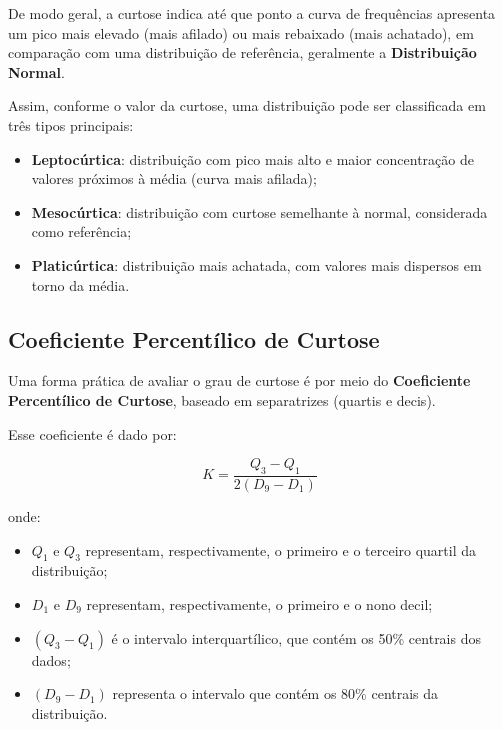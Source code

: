 De modo geral, a curtose indica até que ponto a curva de frequências apresenta
um pico mais elevado (mais afilado) ou mais rebaixado (mais achatado), em
comparação com uma distribuição de referência, geralmente a
\textbf{Distribuição Normal}. \vskip0.3cm

Assim, conforme o valor da curtose, uma distribuição pode ser classificada em
três tipos principais:

\begin{itemize}
    \item \textbf{Leptocúrtica}: distribuição com pico mais alto e maior
    concentração de valores próximos à média (curva mais afilada);

    \item \textbf{Mesocúrtica}: distribuição com curtose semelhante à normal,
    considerada como referência;

    \item \textbf{Platicúrtica}: distribuição mais achatada, com valores mais
    dispersos em torno da média.
\end{itemize}

\subsection{Coeficiente Percentílico de Curtose}

Uma forma prática de avaliar o grau de curtose é por meio do
\textbf{Coeficiente Percentílico de Curtose}, baseado em separatrizes
(quartis e decis).\vskip0.3cm

Esse coeficiente é dado por:

\begin{equation}\label{eq:curtose}
K = \frac{Q_{3}-Q_{1}}{2(D_{9}-D_{1})}
\end{equation}

onde:

\begin{itemize}
    \item $Q_{1}$ e $Q_{3}$ representam, respectivamente, o primeiro e o terceiro
    quartil da distribuição;

    \item $D_{1}$ e $D_{9}$ representam, respectivamente, o primeiro e o nono
    decil;

    \item $(Q_{3}-Q_{1})$ é o intervalo interquartílico, que contém os 50\%
    centrais dos dados;

    \item $(D_{9}-D_{1})$ representa o intervalo que contém os 80\% centrais
    da distribuição.
\end{itemize}

